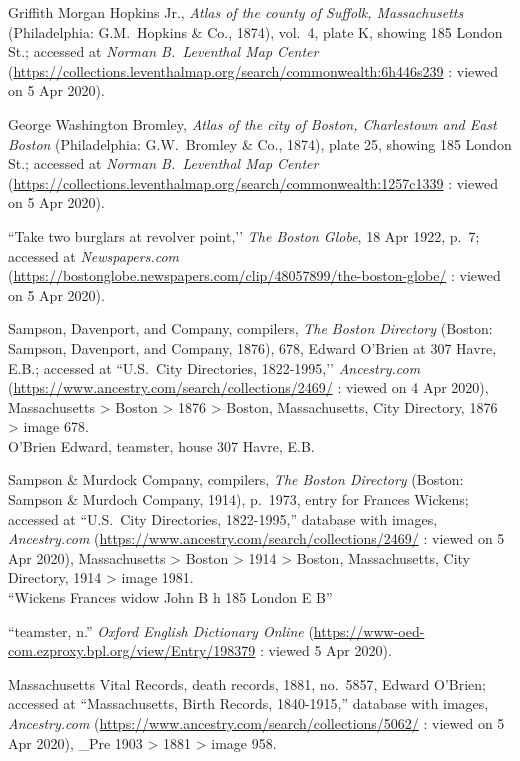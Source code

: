 \begin{thebibliography}{999}
	Griffith Morgan Hopkins Jr., \textit{Atlas of the county of Suffolk, Massachusetts} (Philadelphia: G.M.\ Hopkins \& Co., 1874), vol.\ 4, plate K, showing 185 London St.; accessed at \textit{Norman B.\ Leventhal Map Center} (\url{https://collections.leventhalmap.org/search/commonwealth:6h446s239} : viewed on 5 Apr 2020).
	
	George Washington Bromley, \textit{Atlas of the city of Boston, Charlestown and East Boston} (Philadelphia: G.W.\ Bromley \& Co., 1874), plate 25, showing 185 London St.; accessed at \textit{Norman B.\ Leventhal Map Center} (\url{https://collections.leventhalmap.org/search/commonwealth:1257c1339} : viewed on 5 Apr 2020).
	
	``Take two burglars at revolver point,’’ \textit{The Boston Globe}, 18 Apr 1922, p.\ 7; accessed at \textit{Newspapers.com} (\url{https://bostonglobe.newspapers.com/clip/48057899/the-boston-globe/} : viewed on 5 Apr 2020).
	
	Sampson, Davenport, and Company, compilers, \textit{The Boston Directory} (Boston: Sampson, Davenport, and Company, 1876), 678, Edward O’Brien at 307 Havre, E.B.; accessed at ``U.S.\ City Directories, 1822-1995,’’ \textit{Ancestry.com} (\url{https://www.ancestry.com/search/collections/2469/} : viewed on 4 Apr 2020), Massachusetts > Boston > 1876 > Boston, Massachusetts, City Directory, 1876 > image 678.\\
	O’Brien Edward, teamster, house 307 Havre, E.B.
	
	Sampson \& Murdock Company, compilers, \textit{The Boston Directory} (Boston: Sampson \& Murdoch Company, 1914), p.\ 1973, entry for Frances Wickens; accessed at ``U.S.\ City Directories, 1822-1995,'' database with images, \textit{Ancestry.com} (\url{https://www.ancestry.com/search/collections/2469/} : viewed on 5 Apr 2020), Massachusetts > Boston > 1914 > Boston, Massachusetts, City Directory, 1914 > image 1981.\\
	``Wickens Frances widow John B h 185 London E B''
	
	``teamster, n.'' \textit{Oxford English Dictionary Online} (\url{https://www-oed-com.ezproxy.bpl.org/view/Entry/198379} : viewed 5 Apr 2020).
	
	Massachusetts Vital Records, death records, 1881, no.\ 5857, Edward O'Brien; accessed at ``Massachusetts, Birth Records, 1840-1915,'' database with images, \textit{Ancestry.com} (\url{https://www.ancestry.com/search/collections/5062/} : viewed on 5 Apr 2020), \_Pre 1903 > 1881 > image 958.
	

\end{thebibliography}
